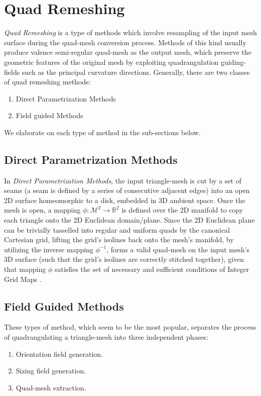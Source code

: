 \section{Quad Remeshing}
\emph{Quad Remeshing} is a type of methods which involve resampling of the input mesh surface during the quad-mesh conversion process. Methods of this kind usually produce valence semi-regular quad-mesh as the output mesh, which preserve the geometric features of the original mesh by exploiting quadrangulation guiding-fields such as the principal curvature directions. Generally, there are two classes of quad remeshing methods:
\begin{enumerate}
\item Direct Parametrization Methods
\item Field guided Methods
\end{enumerate}
We elaborate on each type of method in the sub-sections below.

\subsection{Direct Parametrization Methods}
In \emph{Direct Parametrization Methods}, the input triangle-mesh is cut by a set of seams (a seam is defined by a series of consecutive adjacent edges) into an open 2D surface homeomorphic to a disk, embedded in 3D ambient space. Once the mesh is open, a mapping $\phi:\mathcal{M}^2\rightarrow\mathbb{R}^2$ is defined over the 2D manifold to copy each triangle onto the 2D Euclidean domain/plane. Since the 2D Euclidean plane can be trivially tasselled into regular and uniform quads by the canonical Cartesian grid, lifting the grid's isolines back onto the mesh's manifold, by utilizing the inverse mapping $\phi^{-1}$, forms a valid quad-mesh on the input mesh's 3D surface (such that the grid's isolines are correctly stitched together), given that mapping $\phi$ satisfies the set of necessary and sufficient conditions of Integer Grid Maps \cite{bommes:hal-00862648}.

\subsection{Field Guided Methods}
These types of method, which seem to be the most popular, separates the process of quadrangulating a triangle-mesh into three independent phases:

\begin{enumerate}
\item Orientation field generation.
\item Sizing field generation.
\item Quad-mesh extraction.
\end{enumerate}

